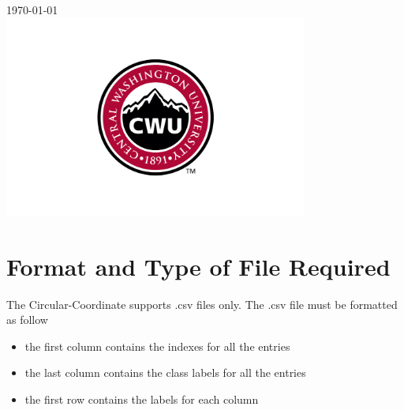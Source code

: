 \documentclass[12pt]{article}
\begin{document}
\begin{titlepage}
		
		
		{\large \today}\\ %
		
		
		\includegraphics[width=10cm]{CWU-Logo.png}\\[.5cm] %
		
		
		\vfill %
		
	\end{titlepage}
	\newpage
	\tableofcontents
	\newpage
	
	
	\section{Format and Type of File Required}
		The Circular-Coordinate supports .csv files only. The .csv file must be formatted as follow
			\begin{itemize}
				\item the first column contains the indexes for all the  entries 
				\item the last column contains the class labels for all the entries
				\item the first row contains the labels for each column
			\end{itemize}
		
\end{document}
